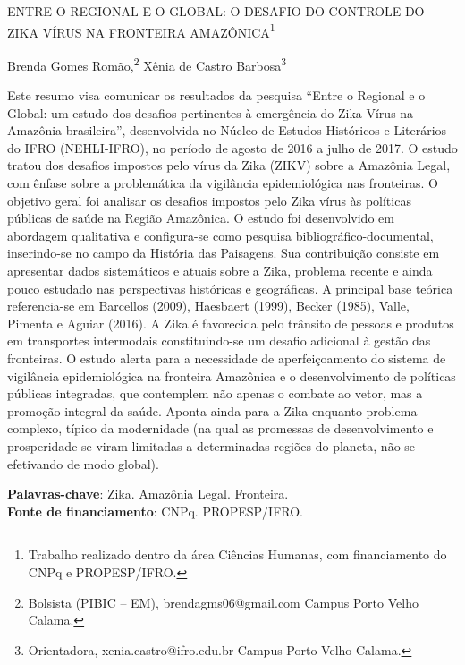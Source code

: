 \documentclass[article,12pt,onesidea,4paper,english,brazil]{abntex2}
\begin{document}
	
	
	\frenchspacing 
	
	\begin{center}
		\LARGE ENTRE O REGIONAL E O GLOBAL: O DESAFIO DO CONTROLE DO ZIKA VÍRUS NA FRONTEIRA AMAZÔNICA\footnote{Trabalho realizado dentro da área Ciências Humanas, com financiamento do CNPq e PROPESP/IFRO.}
		
		\normalsize
	Brenda Gomes Romão,\footnote{Bolsista (PIBIC – EM), brendagms06@gmail.com Campus Porto Velho Calama.} 
		Xênia de Castro Barbosa\footnote{Orientadora, xenia.castro@ifro.edu.br Campus Porto Velho Calama.} 
	
	\end{center}
	
	\noindent Este resumo visa comunicar os resultados da pesquisa “Entre o Regional e o Global: um estudo dos desafios pertinentes à emergência do Zika Vírus na Amazônia brasileira”, desenvolvida no Núcleo de Estudos Históricos e Literários do IFRO (NEHLI-IFRO), no período de agosto de 2016 a julho de 2017. O estudo tratou dos desafios impostos pelo vírus da Zika (ZIKV) sobre a Amazônia Legal, com ênfase sobre a problemática da vigilância epidemiológica nas fronteiras. O objetivo geral foi analisar os desafios impostos pelo Zika vírus às políticas públicas de saúde na Região Amazônica. O estudo foi desenvolvido em abordagem qualitativa e configura-se como pesquisa bibliográfico-documental, inserindo-se no campo da História das Paisagens. Sua contribuição consiste em apresentar dados sistemáticos e atuais sobre a Zika, problema recente e ainda pouco estudado nas perspectivas históricas e geográficas. A principal base teórica referencia-se em Barcellos (2009), Haesbaert (1999), Becker (1985), Valle, Pimenta e Aguiar (2016). A Zika é favorecida pelo trânsito de pessoas e produtos em transportes intermodais constituindo-se um desafio adicional à gestão das fronteiras. O estudo alerta para a necessidade de aperfeiçoamento do sistema de vigilância epidemiológica na fronteira Amazônica e o desenvolvimento de políticas públicas integradas, que contemplem não apenas o combate ao vetor, mas a promoção integral da saúde. Aponta ainda para a Zika enquanto problema complexo, típico da modernidade (na qual as promessas de desenvolvimento e prosperidade se viram limitadas a determinadas regiões do planeta, não se efetivando de modo global).
	
	\vspace{\onelineskip}
	
	\noindent
	\textbf{Palavras-chave}: Zika. Amazônia Legal. Fronteira. \\
	\textbf{Fonte de financiamento}: CNPq. PROPESP/IFRO.
	
\end{document}
